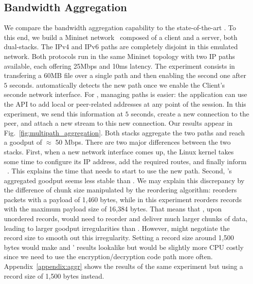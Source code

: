 \subsection{Bandwidth Aggregation}
\label{sec:bwaggr}
We compare the \tcpls bandwidth aggregation capability to the state-of-the-art
\mptcp. To this end, we build a Mininet network~\cite{handigol2012reproducible}
composed of a client and a server, both dual-stacks. The IPv4 and IPv6 paths are
completely disjoint in this emulated network. Both protocols run in the same
Mininet topology with two IP paths available, each offering 25Mbps and 10ms
latency. The experiment consists in transfering a 60MB file over a single path
and then enabling the second one after $5$ seconds. \mptcp automatically detects
the new path once we enable the Client's seconde network interface. For \tcpls,
managing paths is easier: the application can use the API to add local or
peer-related addresses at any point of the session. In this experiment, we send
this information at $5$ seconds, create a new \tcp connection to the peer, and
attach a new stream to this new connection. Our results appear in
Fig.~\ref{fig:multipath_aggregation}. Both stacks aggregate the two paths and
reach a goodput of $\approx$ 50 Mbps. There are two major differences between
the two stacks. First, when a new network interface comes up, the Linux kernel
takes some time to configure its IP address, add the required routes, and
finally inform \mptcp~\cite{paasch2012exploring}.
This explains the time that \mptcp needs to start to use the new path.
Second, \tcpls's aggregated goodput seems less stable than \mptcp. We may explain this discrepancy by the difference of chunk size manipulated by the reordering algorithm: \mptcp reorders packets with a payload of 1,460 bytes, while \tcpls in this experiment reorders records with the maximum payload size of 16,384 bytes. That means that \tcpls, upon unordered records, would need to reorder and deliver much larger chunks of data, leading to larger goodput irregularities than \mptcp. However, \tcpls might negotiate the record size to smooth out this irregularity. Setting a record size around 1,500 bytes would make \mptcp and \tcpls' results lookalike but would be slightly more CPU costly since we need to use the encryption/decryption code path more often.
Appendix~\ref{appendix:aggr} shows the results of the same experiment but using
a \tls record size of 1,500 bytes instead.

